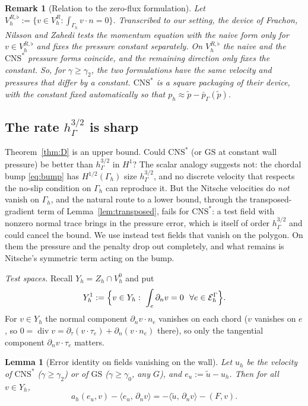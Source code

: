 \documentclass[pdflatex,sn-mathphys-num]{sn-jnl}
\theoremstyle{thmstyleone}
\newtheorem{lemma}[theorem]{Lemma}
\theoremstyle{thmstylethree}
\newtheorem{remark}[theorem]{Remark}
\newcommand{\hG}{h_\Gamma}
\newcommand{\Gh}{\Gamma_h}
\newcommand{\EG}{\mathcal E_h^\Gamma}
\newcommand{\VR}{V_h^R}
\newcommand{\VO}{V_h^0}
\newcommand{\Zh}{Z_h}
\newcommand{\Yh}{Y_h}
\newcommand{\dn}{\partial_n}
\newcommand{\dt}{\partial_\tau}
\newcommand{\ut}{\tilde u}
\newcommand{\pt}{\tilde p}
\newcommand{\pbG}{\bar p_{\Gamma}}
\newcommand{\ip}[2]{\langle #1,\, #2\rangle}
\newcommand{\GS}{\mathrm{GS}}
\newcommand{\CNS}{\mathrm{CNS}^\ast}
\renewcommand{\div}{\operatorname{div}}
\begin{document}
\begin{remark}[Relation to the zero-flux formulation]\label{rem:fnz}
Let $V_h^{R,\flat}:=\{v\in\VR:\int_{\Gh}v\cdot n=0\}$. Transcribed to our setting, the device of Frachon, Nilsson and Zahedi \cite[Section~5.1]{FrachonNilssonZahedi2024} tests the momentum equation with the naive form only for $v\in V_h^{R,\flat}$ and fixes the pressure constant separately. On $V_h^{R,\flat}$ the naive and the $\CNS$ pressure forms coincide, and the remaining direction only fixes the constant. So, for $\gamma\ge\gamma_2$, the two formulations have the \emph{same velocity} and pressures that differ by a constant. $\CNS$ is a square packaging of their device, with the constant fixed automatically so that $p_h\approx\pt-\pbG(\pt)$.
\end{remark}

\subsection{The rate \texorpdfstring{$\hG^{3/2}$}{h^(3/2)} is sharp}\label{sec:lb}
Theorem~\ref{thm:D} is an upper bound. Could $\CNS$ (or $\GS$ at constant wall pressure) be better than $\hG^{3/2}$ in $H^1$? The scalar analogy suggests not: the chordal bump \eqref{eq:bump} has $H^{1/2}(\Gh)$ size $\hG^{3/2}$, and no discrete velocity that respects the no-slip condition on $\Gh$ can reproduce it. But the Nitsche velocities do \emph{not} vanish on $\Gh$, and the natural route to a lower bound, through the transposed-gradient term of Lemma~\ref{lem:transposed}, fails for $\CNS$: a test field with nonzero normal trace brings in the pressure error, which is itself of order $\hG^{3/2}$ and could cancel the bound. We use instead test fields that vanish on the polygon. On them the pressure and the penalty drop out completely, and what remains is Nitsche's symmetric term acting on the bump.

\emph{Test spaces.} Recall $\Yh=\Zh\cap\VO$ and put
\[
\Yh^1:=\Bigl\{v\in\Yh:\ \int_e\dn v=0\ \ \forall e\in\EG\Bigr\}.
\]
For $v\in\Yh$ the normal component $\dn v\cdot n_e$ vanishes on each chord ($v$ vanishes on $e$, so $0=\div v=\dt(v\cdot\tau_e)+\dn(v\cdot n_e)$ there), so only the tangential component $\dn v\cdot\tau_e$ matters.

\begin{lemma}[Error identity on fields vanishing on the wall]\label{lem:lbid}
Let $u_h$ be the velocity of $\CNS$ ($\gamma\ge\gamma_2$) or of $\GS$ ($\gamma\ge\gamma_0$, any $G$), and $e_u:=\ut-u_h$. Then for all $v\in\Yh$,
\[
a_h(e_u,v)-\ip{e_u}{\dn v}=-\ip{\ut}{\dn v}-(F,v).
\]
\end{lemma}
\end{document}
